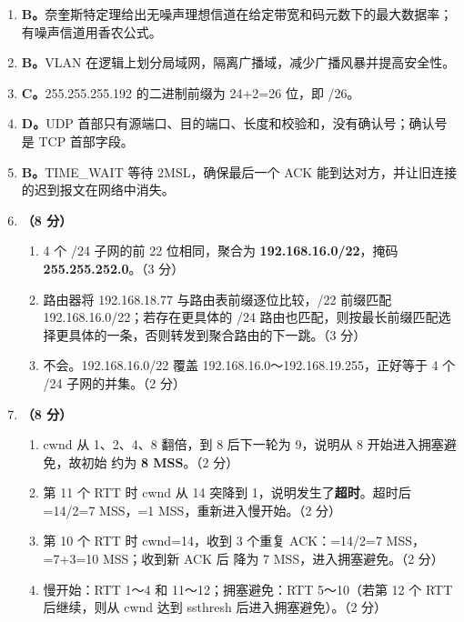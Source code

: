 \documentclass[a4paper,11pt]{article}
\begin{document}

\begin{enumerate}[start=13, label=\textbf{\arabic*.}, leftmargin=2.4em, itemsep=0.45em]

\item \textbf{B。}奈奎斯特定理给出无噪声理想信道在给定带宽和码元数下的最大数据率；有噪声信道用香农公式。

\item \textbf{B。}VLAN 在逻辑上划分局域网，隔离广播域，减少广播风暴并提高安全性。

\item \textbf{C。}255.255.255.192 的二进制前缀为 24+2=26 位，即 /26。

\item \textbf{D。}UDP 首部只有源端口、目的端口、长度和校验和，没有确认号；确认号是 TCP 首部字段。

\item \textbf{B。}TIME_WAIT 等待 2MSL，确保最后一个 ACK 能到达对方，并让旧连接的迟到报文在网络中消失。

\item \textbf{（8 分）}
\begin{enumerate}[label=（\arabic*）, leftmargin=2.2em, itemsep=1pt]
  \item 4 个 /24 子网的前 22 位相同，聚合为 \textbf{192.168.16.0/22}，掩码 \textbf{255.255.252.0}。\hfill（3 分）
  \item 路由器将 192.168.18.77 与路由表前缀逐位比较，/22 前缀匹配 192.168.16.0/22；若存在更具体的 /24 路由也匹配，则按最长前缀匹配选择更具体的一条，否则转发到聚合路由的下一跳。\hfill（3 分）
  \item 不会。192.168.16.0/22 覆盖 192.168.16.0～192.168.19.255，正好等于 4 个 /24 子网的并集。\hfill（2 分）
\end{enumerate}

\item \textbf{（8 分）}
\begin{enumerate}[label=（\arabic*）, leftmargin=2.2em, itemsep=1pt]
  \item cwnd 从 1、2、4、8 翻倍，到 8 后下一轮为 9，说明从 8 开始进入拥塞避免，故初始  约为 \textbf{8 MSS}。\hfill（2 分）
  \item 第 11 个 RTT 时 cwnd 从 14 突降到 1，说明发生了\textbf{超时}。超时后 =14/2=7 MSS，=1 MSS，重新进入慢开始。\hfill（2 分）
  \item 第 10 个 RTT 时 cwnd=14，收到 3 个重复 ACK：=14/2=7 MSS，=7+3=10 MSS；收到新 ACK 后  降为 7 MSS，进入拥塞避免。\hfill（2 分）
  \item 慢开始：RTT 1～4 和 11～12；拥塞避免：RTT 5～10（若第 12 个 RTT 后继续，则从 cwnd 达到 ssthresh 后进入拥塞避免）。\hfill（2 分）
\end{enumerate}


\end{enumerate}
\end{document}
